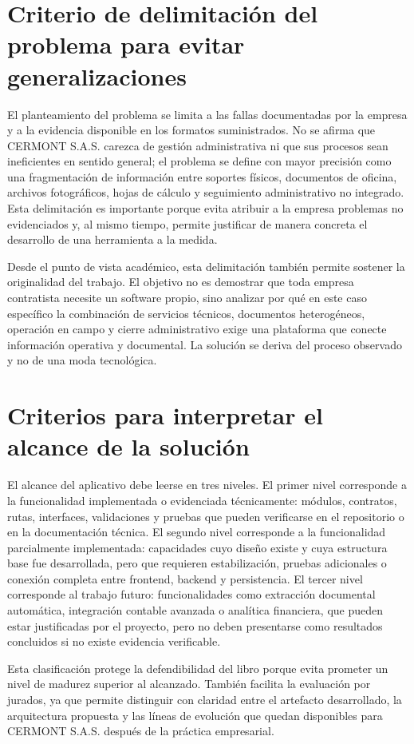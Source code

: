 \section{Criterio de delimitación del problema para evitar generalizaciones}
\label{sec:delimitacion-problema-real}

El planteamiento del problema se limita a las fallas documentadas por la empresa y a la evidencia disponible en los formatos suministrados. No se afirma que CERMONT S.A.S. carezca de gestión administrativa ni que sus procesos sean ineficientes en sentido general; el problema se define con mayor precisión como una fragmentación de información entre soportes físicos, documentos de oficina, archivos fotográficos, hojas de cálculo y seguimiento administrativo no integrado. Esta delimitación es importante porque evita atribuir a la empresa problemas no evidenciados y, al mismo tiempo, permite justificar de manera concreta el desarrollo de una herramienta a la medida.

Desde el punto de vista académico, esta delimitación también permite sostener la originalidad del trabajo. El objetivo no es demostrar que toda empresa contratista necesite un software propio, sino analizar por qué en este caso específico la combinación de servicios técnicos, documentos heterogéneos, operación en campo y cierre administrativo exige una plataforma que conecte información operativa y documental. La solución se deriva del proceso observado y no de una moda tecnológica.

\section{Criterios para interpretar el alcance de la solución}
\label{sec:criterios-alcance-solucion}

El alcance del aplicativo debe leerse en tres niveles. El primer nivel corresponde a la funcionalidad implementada o evidenciada técnicamente: módulos, contratos, rutas, interfaces, validaciones y pruebas que pueden verificarse en el repositorio o en la documentación técnica. El segundo nivel corresponde a la funcionalidad parcialmente implementada: capacidades cuyo diseño existe y cuya estructura base fue desarrollada, pero que requieren estabilización, pruebas adicionales o conexión completa entre frontend, backend y persistencia. El tercer nivel corresponde al trabajo futuro: funcionalidades como extracción documental automática, integración contable avanzada o analítica financiera, que pueden estar justificadas por el proyecto, pero no deben presentarse como resultados concluidos si no existe evidencia verificable.

Esta clasificación protege la defendibilidad del libro porque evita prometer un nivel de madurez superior al alcanzado. También facilita la evaluación por jurados, ya que permite distinguir con claridad entre el artefacto desarrollado, la arquitectura propuesta y las líneas de evolución que quedan disponibles para CERMONT S.A.S. después de la práctica empresarial.
